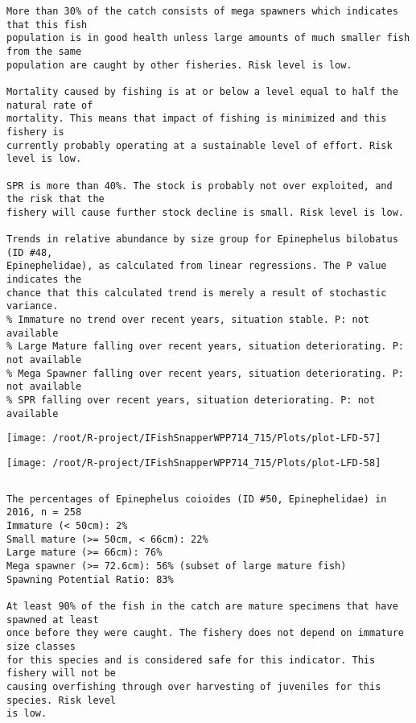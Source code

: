 \documentclass{report}\usepackage[]{graphicx}\usepackage[]{color}
\makeatletter
\def\maxwidth{ %
  \ifdim\Gin@nat@width>\linewidth
    \linewidth
  \else
    \Gin@nat@width
  \fi
}
\newenvironment{kframe}{%
 \def\at@end@of@kframe{}%
 \ifinner\ifhmode%
  \def\at@end@of@kframe{\end{minipage}}%
  \begin{minipage}{\columnwidth}%
 \fi\fi%
 \def\FrameCommand##1{\hskip\@totalleftmargin \hskip-\fboxsep
 \colorbox{shadecolor}{##1}\hskip-\fboxsep
     \hskip-\linewidth \hskip-\@totalleftmargin \hskip\columnwidth}%
 \MakeFramed {\advance\hsize-\width
   \@totalleftmargin\z@ \linewidth\hsize
   \@setminipage}}%
 {\par\unskip\endMakeFramed%
 \at@end@of@kframe}
\newenvironment{knitrout}{}{} %
\makeatother
\begin{document}
\begin{knitrout}
\begin{kframe}
\begin{verbatim}
More than 30% of the catch consists of mega spawners which indicates that this fish
population is in good health unless large amounts of much smaller fish from the same
population are caught by other fisheries. Risk level is low.
 
Mortality caused by fishing is at or below a level equal to half the natural rate of
mortality. This means that impact of fishing is minimized and this fishery is
currently probably operating at a sustainable level of effort. Risk level is low.
 
SPR is more than 40%. The stock is probably not over exploited, and the risk that the
fishery will cause further stock decline is small. Risk level is low.
 
Trends in relative abundance by size group for Epinephelus bilobatus (ID #48,
Epinephelidae), as calculated from linear regressions. The P value indicates the
chance that this calculated trend is merely a result of stochastic variance.
% Immature no trend over recent years, situation stable. P: not available
% Large Mature falling over recent years, situation deteriorating. P: not available
% Mega Spawner falling over recent years, situation deteriorating. P: not available
% SPR falling over recent years, situation deteriorating. P: not available
\end{verbatim}
\end{kframe}
\texttt{[image: /root/R-project/IFishSnapperWPP714\_715/Plots/plot-LFD-57]} 

\texttt{[image: /root/R-project/IFishSnapperWPP714\_715/Plots/plot-LFD-58]} 
\begin{kframe}\begin{verbatim}
\end{verbatim}
\end{kframe}
\clearpage
\newpage
\begin{kframe}\begin{verbatim}The percentages of Epinephelus coioides (ID #50, Epinephelidae) in 2016, n = 258
Immature (< 50cm): 2%
Small mature (>= 50cm, < 66cm): 22%
Large mature (>= 66cm): 76%
Mega spawner (>= 72.6cm): 56% (subset of large mature fish)
Spawning Potential Ratio: 83%
 
At least 90% of the fish in the catch are mature specimens that have spawned at least
once before they were caught. The fishery does not depend on immature size classes
for this species and is considered safe for this indicator. This fishery will not be
causing overfishing through over harvesting of juveniles for this species. Risk level
is low.


\end{verbatim}
\end{kframe}
\end{knitrout}
\end{document}
